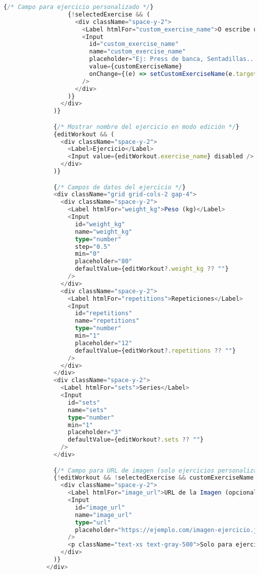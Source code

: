 \documentclass[12pt,a4paper]{article}
\begin{document}
\begin{lstlisting}[language=typescript, caption=components/gym/workout-form.tsx - Estructura principal]
                  {/* Campo para ejercicio personalizado */}
                  {!selectedExercise && (
                    <div className="space-y-2">
                      <Label htmlFor="custom_exercise_name">O escribe un ejercicio personalizado</Label>
                      <Input
                        id="custom_exercise_name"
                        name="custom_exercise_name"
                        placeholder="Ej: Press de banca, Sentadillas..."
                        value={customExerciseName}
                        onChange={(e) => setCustomExerciseName(e.target.value)}
                      />
                    </div>
                  )}
                </div>
              )}

              {/* Mostrar nombre del ejercicio en modo edición */}
              {editWorkout && (
                <div className="space-y-2">
                  <Label>Ejercicio</Label>
                  <Input value={editWorkout.exercise_name} disabled />
                </div>
              )}

              {/* Campos de datos del ejercicio */}
              <div className="grid grid-cols-2 gap-4">
                <div className="space-y-2">
                  <Label htmlFor="weight_kg">Peso (kg)</Label>
                  <Input
                    id="weight_kg"
                    name="weight_kg"
                    type="number"
                    step="0.5"
                    min="0"
                    placeholder="80"
                    defaultValue={editWorkout?.weight_kg ?? ""}
                  />
                </div>
                <div className="space-y-2">
                  <Label htmlFor="repetitions">Repeticiones</Label>
                  <Input
                    id="repetitions"
                    name="repetitions"
                    type="number"
                    min="1"
                    placeholder="12"
                    defaultValue={editWorkout?.repetitions ?? ""}
                  />
                </div>
              </div>
              <div className="space-y-2">
                <Label htmlFor="sets">Series</Label>
                <Input
                  id="sets"
                  name="sets"
                  type="number"
                  min="1"
                  placeholder="3"
                  defaultValue={editWorkout?.sets ?? ""}
                />
              </div>

              {/* Campo para URL de imagen (solo ejercicios personalizados) */}
              {!editWorkout && !selectedExercise && customExerciseName && (
                <div className="space-y-2">
                  <Label htmlFor="image_url">URL de la Imagen (opcional)</Label>
                  <Input
                    id="image_url"
                    name="image_url"
                    type="url"
                    placeholder="https://ejemplo.com/imagen-ejercicio.jpg"
                  />
                  <p className="text-xs text-gray-500">Solo para ejercicios personalizados</p>
                </div>
              )}
            </div>


\end{lstlisting}
\end{document}
